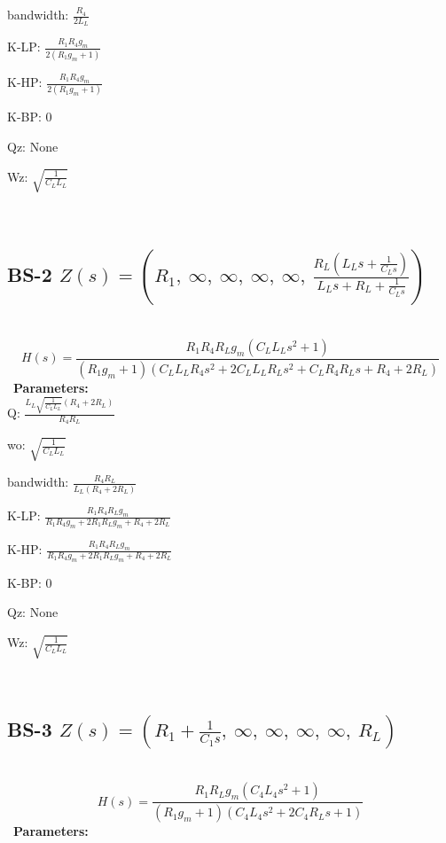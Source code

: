 \documentclass{article}
\begin{document}
bandwidth: $\frac{R_{4}}{2 L_{L}}$\ 

K-LP: $\frac{R_{1} R_{4} g_{m}}{2 \left(R_{1} g_{m} + 1\right)}$\ 

K-HP: $\frac{R_{1} R_{4} g_{m}}{2 \left(R_{1} g_{m} + 1\right)}$\ 

K-BP: $0$\ 

Qz: $\text{None}$\ 

Wz: $\sqrt{\frac{1}{C_{L} L_{L}}}$\ 

\ 

\subsection{BS-2 $Z(s) = \left( R_{1}, \  \infty, \  \infty, \  \infty, \  \infty, \  \frac{R_{L} \left(L_{L} s + \frac{1}{C_{L} s}\right)}{L_{L} s + R_{L} + \frac{1}{C_{L} s}}\right)$ } \ 
\textbf{\[H(s) = \frac{R_{1} R_{4} R_{L} g_{m} \left(C_{L} L_{L} s^{2} + 1\right)}{\left(R_{1} g_{m} + 1\right) \left(C_{L} L_{L} R_{4} s^{2} + 2 C_{L} L_{L} R_{L} s^{2} + C_{L} R_{4} R_{L} s + R_{4} + 2 R_{L}\right)}\] } \ 
\textbf{Parameters:}\\ 

Q: $\frac{L_{L} \sqrt{\frac{1}{C_{L} L_{L}}} \left(R_{4} + 2 R_{L}\right)}{R_{4} R_{L}}$\ 

wo: $\sqrt{\frac{1}{C_{L} L_{L}}}$\ 

bandwidth: $\frac{R_{4} R_{L}}{L_{L} \left(R_{4} + 2 R_{L}\right)}$\ 

K-LP: $\frac{R_{1} R_{4} R_{L} g_{m}}{R_{1} R_{4} g_{m} + 2 R_{1} R_{L} g_{m} + R_{4} + 2 R_{L}}$\ 

K-HP: $\frac{R_{1} R_{4} R_{L} g_{m}}{R_{1} R_{4} g_{m} + 2 R_{1} R_{L} g_{m} + R_{4} + 2 R_{L}}$\ 

K-BP: $0$\ 

Qz: $\text{None}$\ 

Wz: $\sqrt{\frac{1}{C_{L} L_{L}}}$\ 

\ 

\subsection{BS-3 $Z(s) = \left( R_{1} + \frac{1}{C_{1} s}, \  \infty, \  \infty, \  \infty, \  \infty, \  R_{L}\right)$ } \ 
\textbf{\[H(s) = \frac{R_{1} R_{L} g_{m} \left(C_{4} L_{4} s^{2} + 1\right)}{\left(R_{1} g_{m} + 1\right) \left(C_{4} L_{4} s^{2} + 2 C_{4} R_{L} s + 1\right)}\] } \ 
\textbf{Parameters:}\\ 
\end{document}
